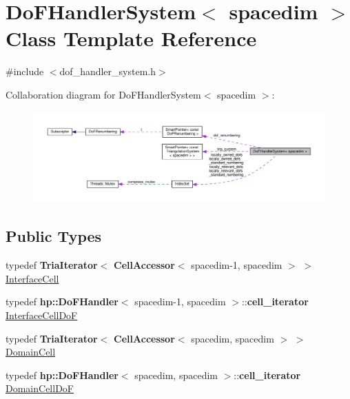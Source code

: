 \hypertarget{class_do_f_handler_system}{}\section{Do\+F\+Handler\+System$<$ spacedim $>$ Class Template Reference}
\label{class_do_f_handler_system}


{\ttfamily \#include $<$dof\+\_\+handler\+\_\+system.\+h$>$}



Collaboration diagram for Do\+F\+Handler\+System$<$ spacedim $>$\+:
\nopagebreak
\begin{figure}[H]
\begin{center}
\leavevmode
\includegraphics[width=350pt]{class_do_f_handler_system__coll__graph}
\end{center}
\end{figure}
\subsection*{Public Types}
\begin{DoxyCompactItemize}
\item 
typedef {\bf Tria\+Iterator}$<$ {\bf Cell\+Accessor}$<$ spacedim-\/1, spacedim $>$ $>$ \hyperlink{class_do_f_handler_system_a64bfb9dab5f61c2583896a7d086cb1f2}{Interface\+Cell}
\item 
typedef {\bf hp\+::\+Do\+F\+Handler}$<$ spacedim-\/1, spacedim $>$\+::{\bf cell\+\_\+iterator} \hyperlink{class_do_f_handler_system_a82e65f8c260f076489bd92615221a1d0}{Interface\+Cell\+DoF}
\item 
typedef {\bf Tria\+Iterator}$<$ {\bf Cell\+Accessor}$<$ spacedim, spacedim $>$ $>$ \hyperlink{class_do_f_handler_system_a84df955a5d8da7e1439a10f2a64811c0}{Domain\+Cell}
\item 
typedef {\bf hp\+::\+Do\+F\+Handler}$<$ spacedim, spacedim $>$\+::{\bf cell\+\_\+iterator} \hyperlink{class_do_f_handler_system_a01c54960bba8faa935d32f2d3d2fe914}{Domain\+Cell\+DoF}
\end{DoxyCompactItemize}
